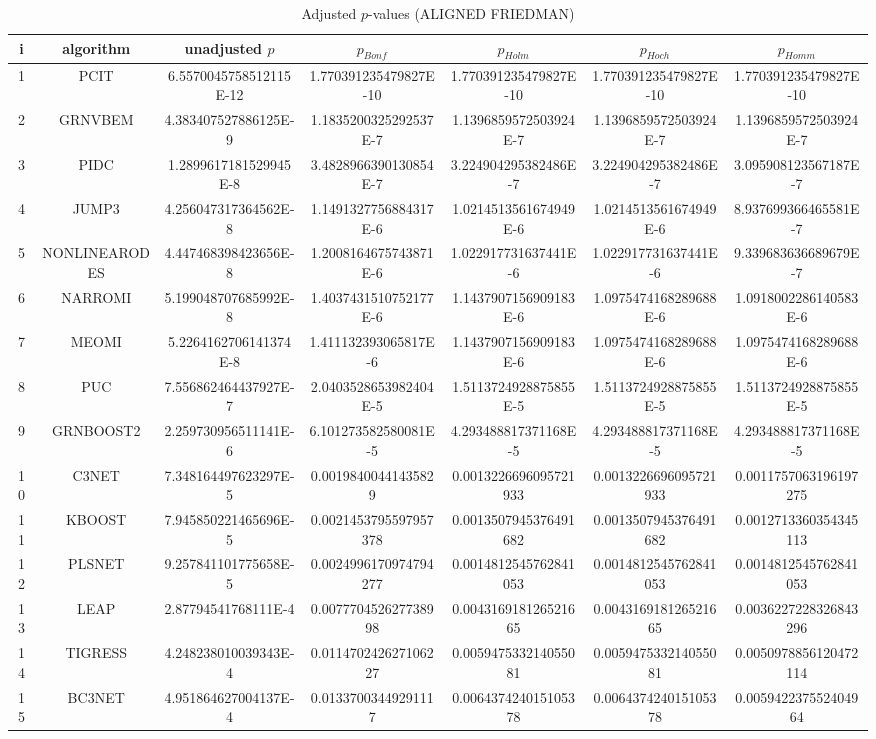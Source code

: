 \documentclass[a4paper,10pt]{article}
\begin{document}
\begin{landscape}
\begin{table}[!htp]
\centering\scriptsize
\caption{Adjusted $p$-values (ALIGNED FRIEDMAN)}
\begin{tabular}{ccccccc}
i&algorithm&unadjusted $p$&$p_{Bonf}$&$p_{Holm}$&$p_{Hoch}$&$p_{Homm}$\\
\hline
1&PCIT&6.5570045758512115E-12&1.770391235479827E-10&1.770391235479827E-10&1.770391235479827E-10&1.770391235479827E-10\\
2&GRNVBEM&4.383407527886125E-9&1.1835200325292537E-7&1.1396859572503924E-7&1.1396859572503924E-7&1.1396859572503924E-7\\
3&PIDC&1.2899617181529945E-8&3.4828966390130854E-7&3.224904295382486E-7&3.224904295382486E-7&3.095908123567187E-7\\
4&JUMP3&4.256047317364562E-8&1.1491327756884317E-6&1.0214513561674949E-6&1.0214513561674949E-6&8.937699366465581E-7\\
5&NONLINEARODES&4.447468398423656E-8&1.2008164675743871E-6&1.022917731637441E-6&1.022917731637441E-6&9.339683636689679E-7\\
6&NARROMI&5.199048707685992E-8&1.4037431510752177E-6&1.1437907156909183E-6&1.0975474168289688E-6&1.0918002286140583E-6\\
7&MEOMI&5.2264162706141374E-8&1.411132393065817E-6&1.1437907156909183E-6&1.0975474168289688E-6&1.0975474168289688E-6\\
8&PUC&7.556862464437927E-7&2.0403528653982404E-5&1.5113724928875855E-5&1.5113724928875855E-5&1.5113724928875855E-5\\
9&GRNBOOST2&2.259730956511141E-6&6.101273582580081E-5&4.293488817371168E-5&4.293488817371168E-5&4.293488817371168E-5\\
10&C3NET&7.348164497623297E-5&0.00198400441435829&0.0013226696095721933&0.0013226696095721933&0.0011757063196197275\\
11&KBOOST&7.945850221465696E-5&0.0021453795597957378&0.0013507945376491682&0.0013507945376491682&0.0012713360354345113\\
12&PLSNET&9.257841101775658E-5&0.0024996170974794277&0.0014812545762841053&0.0014812545762841053&0.0014812545762841053\\
13&LEAP&2.87794541768111E-4&0.007770452627738998&0.004316918126521665&0.004316918126521665&0.0036227228326843296\\
14&TIGRESS&4.248238010039343E-4&0.011470242627106227&0.005947533214055081&0.005947533214055081&0.0050978856120472114\\
15&BC3NET&4.951864627004137E-4&0.01337003449291117&0.006437424015105378&0.006437424015105378&0.005942237552404964\\

\end{tabular}
\end{table}
\end{landscape}
\end{document}
